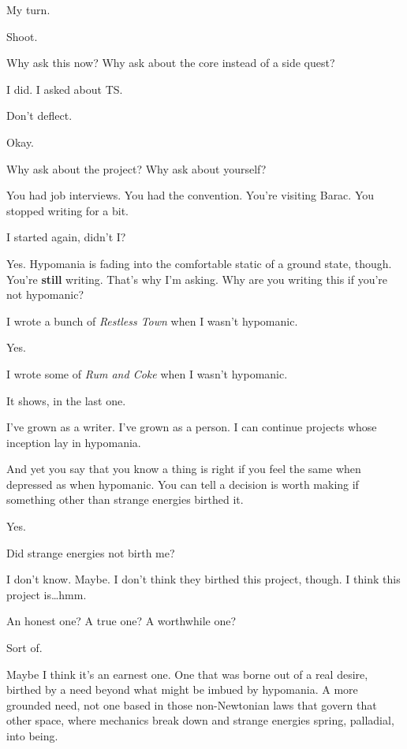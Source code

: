 \label{ally:22}
\begin{paracol}{2}
  \begin{leftcolumn}

\noindent My turn.

\begin{ally}
Shoot.
\end{ally}
Why ask this now? Why ask about the core instead of a side quest?

\begin{ally}
I did. I asked about TS.
\end{ally}
Don't deflect.

\begin{ally}
Okay.
\end{ally}
Why ask about the project? Why ask about yourself?

\begin{ally}
You had job interviews. You had the convention. You're visiting Barac. You stopped writing for a bit.
\end{ally}
I started again, didn't I?

\begin{ally}
Yes. Hypomania is fading into the comfortable static of a ground state, though. You're \textbf{still} writing. That's why I'm asking. Why are you writing this if you're not hypomanic?
\end{ally}
I wrote a bunch of \emph{Restless Town} when I wasn't hypomanic.

\begin{ally}
Yes.
\end{ally}
I wrote some of \emph{Rum and Coke} when I wasn't hypomanic.

\begin{ally}
It shows, in the last one.
\end{ally}
I've grown as a writer. I've grown as a person. I can continue projects whose inception lay in hypomania.

\begin{ally}
And yet you say that you know a thing is right if you feel the same when depressed as when hypomanic. You can tell a decision is worth making if something other than strange energies birthed it.
\end{ally}
Yes.

\begin{ally}
Did strange energies not birth me?
\end{ally}
I don't know. Maybe. I don't think they birthed this project, though. I think this project is\ldots{}hmm.

\begin{ally}
An honest one? A true one? A worthwhile one?
\end{ally}
Sort of.

Maybe I think it's an earnest one. One that was borne out of a real desire, birthed by a need beyond what might be imbued by hypomania. A more grounded need, not one based in those non-Newtonian laws that govern that other space, where mechanics break down and strange energies spring, palladial, into being.
\newpage
\end{leftcolumn}
\end{paracol}
